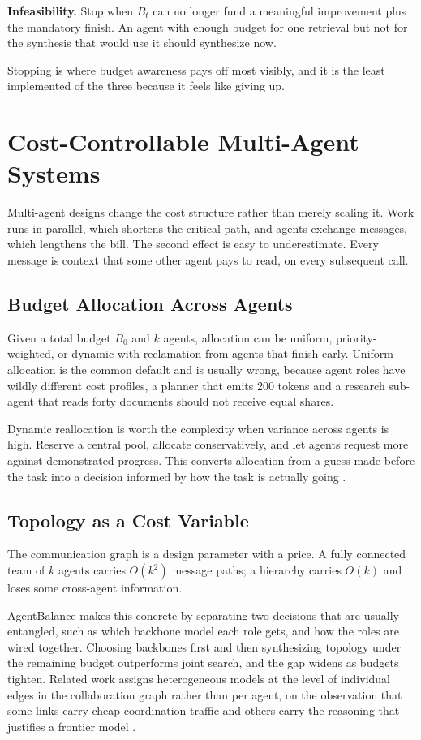 \textbf{Infeasibility.} Stop when $B_t$ can no longer fund a meaningful
improvement plus the mandatory finish. An agent with enough budget for one
retrieval but not for the synthesis that would use it should synthesize now.

Stopping is where budget awareness pays off most visibly, and it is the least
implemented of the three because it feels like giving up.

\section{Cost-Controllable Multi-Agent Systems}

Multi-agent designs change the cost structure rather than merely scaling it.
Work runs in parallel, which shortens the critical path, and agents exchange
messages, which lengthens the bill. The second effect is easy to underestimate. Every message is context that some other agent pays to read, on every subsequent
call.

\subsection{Budget Allocation Across Agents}

Given a total budget $B_0$ and $k$ agents, allocation can be uniform,
priority-weighted, or dynamic with reclamation from agents that finish early.
Uniform allocation is the common default and is usually wrong, because agent
roles have wildly different cost profiles, a planner that emits 200 tokens and
a research sub-agent that reads forty documents should not receive equal shares.

Dynamic reallocation is worth the complexity when variance across agents is high.
Reserve a central pool, allocate conservatively, and let agents request more
against demonstrated progress. This converts allocation from a guess made before
the task into a decision informed by how the task is actually going
\cite{progrouter2026}.

\subsection{Topology as a Cost Variable}

The communication graph is a design parameter with a price. A fully connected
team of $k$ agents carries $O(k^2)$ message paths; a hierarchy carries $O(k)$ and
loses some cross-agent information.

AgentBalance \cite{agentbalance2025} makes this concrete by separating two
decisions that are usually entangled, such as which backbone model each role gets, and
how the roles are wired together. Choosing backbones first and then synthesizing
topology under the remaining budget outperforms joint search, and the gap widens
as budgets tighten. Related work assigns heterogeneous models at the level of
individual edges in the collaboration graph rather than per agent, on the
observation that some links carry cheap coordination traffic and others carry the
reasoning that justifies a frontier model \cite{scmas2026}.

